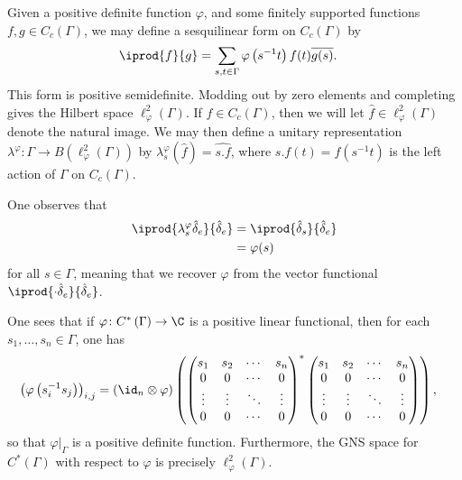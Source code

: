 \documentclass[10pt]{mypackage}
\begin{document}
Given a positive definite function $\varphi$, and some finitely supported functions $f,g\in C_c\left( \Gamma \right)$, we may define a sesquilinear form on $C_c\left( \Gamma \right)$ by
\begin{align*}
  \iprod{f}{g} &= \sum_{s,t\in \Gamma} \varphi\left( s^{-1}t \right)f(t) \overline{g(s)}.
\end{align*}
This form is positive semidefinite. Modding out by zero elements and completing gives the Hilbert space $\ell^2_{\varphi}\left( \Gamma \right)$. If $f\in C_c\left( \Gamma \right)$, then we will let $\hat{f}\in \ell^2_{\varphi}\left( \Gamma \right)$ denote the natural image. We may then define a unitary representation $\lambda^{\varphi}\colon \Gamma\rightarrow B\left( \ell^2_{\varphi}\left( \Gamma \right) \right)$ by $\lambda^{\varphi}_s\left( \hat{f} \right) = \widehat{s.f}$, where $s.f(t) = f\left( s^{-1}t \right)$ is the left action of $\Gamma$ on $C_c\left( \Gamma \right)$.

One observes that
\begin{align*}
  \iprod{\lambda^{\varphi}_s \hat{\delta}_e}{\hat{\delta}_e} &= \iprod{\hat{\delta}_s}{\hat{\delta}_e}\\
                                                             &= \varphi(s)
\end{align*}
for all $s\in \Gamma$, meaning that we recover $\varphi$ from the vector functional $ \iprod{\cdot \hat{\delta}_e}{\hat{\delta}_e} $.

One sees that if $\varphi\colon C^{\ast}\left( \Gamma \right)\rightarrow \C$ is a positive linear functional, then for each $s_1,\dots,s_n\in \Gamma$, one has
\begin{align*}
  \left( \varphi\left( s_i^{-1}s_j \right) \right)_{i,j} &= \left( \id_n\otimes \varphi \right) \left( \begin{pmatrix}s_1 & s_2 & \cdots & s_n \\ 0 & 0 & \cdots & 0 \\ \vdots & \vdots & \ddots & \vdots \\ 0 & 0 & \cdots & 0\end{pmatrix}^{\ast} \begin{pmatrix}s_1 & s_2 & \cdots & s_n \\ 0 & 0 & \cdots & 0 \\ \vdots & \vdots & \ddots & \vdots \\ 0 & 0 & \cdots & 0\end{pmatrix}\right),
\end{align*}
so that $\varphi|_{\Gamma}$ is a positive definite function. Furthermore, the GNS space for $C^{\ast}\left( \Gamma \right)$ with respect to $\varphi$ is precisely $\ell^2_{\varphi}\left( \Gamma \right)$.
\end{document}
